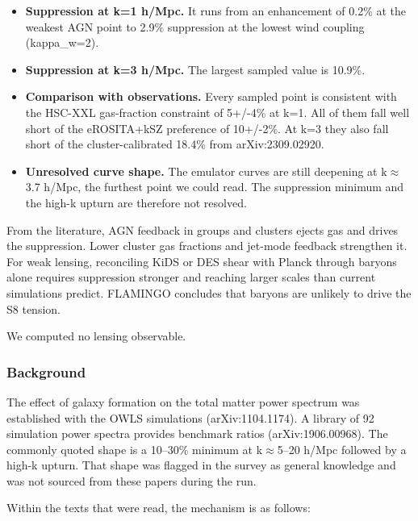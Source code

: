 \documentclass[11pt,a4paper]{article}
\begin{document}
\begin{itemize}
  \item \textbf{Suppression at k=1 h/Mpc.} It runs from an enhancement of 0.2\% at the weakest AGN point to 2.9\% suppression at the lowest wind coupling (kappa\_w=2).
  \item \textbf{Suppression at k=3 h/Mpc.} The largest sampled value is 10.9\%.
  \item \textbf{Comparison with observations.} Every sampled point is consistent with the HSC-XXL gas-fraction constraint of 5+/-4\% at k=1. All of them fall well short of the eROSITA+kSZ preference of 10+/-2\%. At k=3 they also fall short of the cluster-calibrated 18.4\% from arXiv:2309.02920.
  \item \textbf{Unresolved curve shape.} The emulator curves are still deepening at k$\approx$3.7 h/Mpc, the furthest point we could read. The suppression minimum and the high-k upturn are therefore not resolved.
\end{itemize}
From the literature, AGN feedback in groups and clusters ejects gas and drives the suppression. Lower cluster gas fractions and jet-mode feedback strengthen it. For weak lensing, reconciling KiDS or DES shear with Planck through baryons alone requires suppression stronger and reaching larger scales than current simulations predict. FLAMINGO concludes that baryons are unlikely to drive the S8 tension.

We computed no lensing observable.

\subsubsection*{Background}
The effect of galaxy formation on the total matter power spectrum was established with the OWLS simulations (arXiv:1104.1174). A library of 92 simulation power spectra provides benchmark ratios (arXiv:1906.00968). The commonly quoted shape is a 10--30\% minimum at k$\approx$5--20 h/Mpc followed by a high-k upturn. That shape was flagged in the survey as general knowledge and was not sourced from these papers during the run.

Within the texts that were read, the mechanism is as follows:
\end{document}
